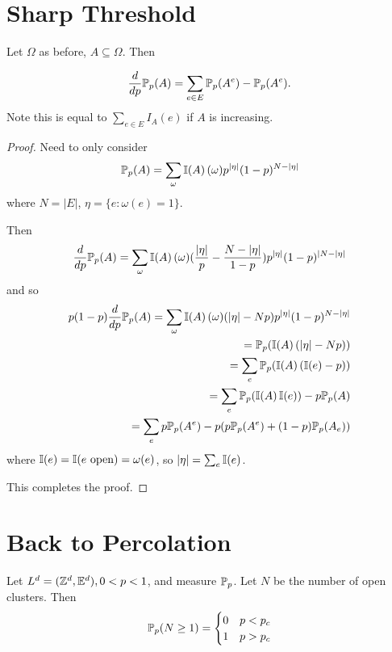 \section{Sharp Threshold}
\label{sec:sharp-threshold}

Let $\Omega$ as before, $A \subseteq \Omega$.  Then
\begin{thm}
  \label{defn:random_walks_on_graphs:24}
  \begin{align}
    \label{eq:31}
    \frac{d}{dp} \Prob_{p}(A) = \sum_{e \in E} \Prob_{p}(A^{e}) - \Prob_{p}(A^{e}).
  \end{align}
  Note this is equal to $\sum_{e \in E} I_{A}(e)$ if $A$ is increasing.
\end{thm}

\begin{proof}
  Need to only consider
  \begin{align}
    \label{eq:32}
    \Prob_{p}(A) = \sum_{\omega} \I{A}(\omega) p^{|\eta|}(1-p)^{N - |\eta|}
  \end{align} where $N = |E|$, $\eta = \{ e: \omega(e)= 1 \}$.

  Then
  \begin{align}
    \label{eq:33}
    \frac{d}{dp}\Prob_{p}(A) = \sum_{\omega} \I{A}(\omega)
    (\frac{|\eta|}{p} - \frac{N - |\eta|}{1 - p}) p^{|\eta|}(1-p)^{|N
      - |\eta|}
  \end{align}
  and so
  \begin{align}
    \label{eq:34}
    p(1-p) \frac{d}{dp}\Prob_{p}(A) = \sum_{\omega}
    \I{A}(\omega)(|\eta| - Np) p^{|\eta|}(1-p)^{N - |\eta|} \\
    = \Prob_{p}(\I{A}(|\eta| - Np)) \\
    = \sum_{e} \Prob_{p}(\I{A}(\I{e} - p)) \\
    = \sum_{e} \Prob_{p}(\I{A}\I{e}) - p \Prob_{p}(A) \\
    = \sum_{e} p \Prob_{p}(A^{e}) - p(p \Prob_{p}(A^{e}) + (1-p) \Prob_{p}(A_{e}))
  \end{align} where $\I{e} = \I{\text{$e$ open}} = \omega(e)$, so
  $|\eta| = \sum_{e} \I{e}$.

  This completes the proof.
\end{proof}

\section{Back to Percolation}
\label{sec:back-percolation}

Let $L^{d} = (\Z^{d}, \E^{d}), 0 < p < 1$, and measure $\Prob_{p}$.
Let $N$ be the number of open clusters.  Then
\begin{align}
  \label{eq:30}
  \Prob_{p}(N \geq 1) =
  \begin{cases}
    \label{eq:38}
    0 & p < p_{c} \\
    \label{eq:39}
    1 & p > p_{c}
  \end{cases}
\end{align}

